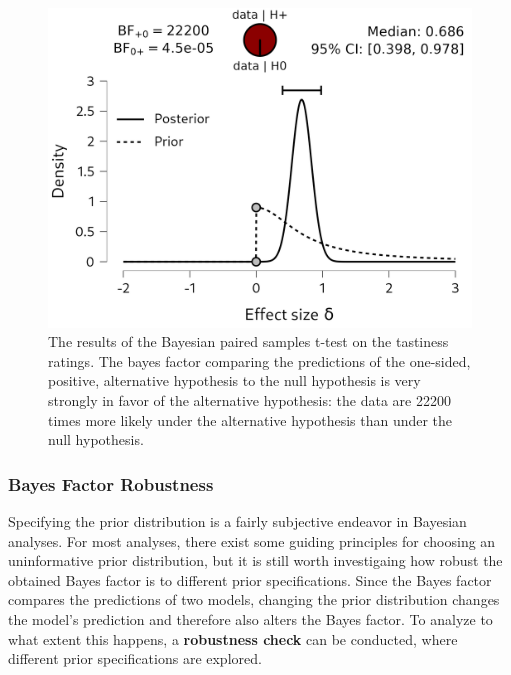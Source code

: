 \documentclass[
  letterpaper,
  DIV=11,
  numbers=noendperiod]{scrreprt}
\begin{document}
\begin{figure}

{\centering \includegraphics[width=1\textwidth,height=\textheight]{Figures/TTestBeerTastiness.png}

}

\caption{The results of the Bayesian paired samples t-test on the
tastiness ratings. The bayes factor comparing the predictions of the
one-sided, positive, alternative hypothesis to the null hypothesis is
very strongly in favor of the alternative hypothesis: the data are 22200
times more likely under the alternative hypothesis than under the null
hypothesis.}

\end{figure}

\hypertarget{bayes-factor-robustness}{%
\subsubsection{Bayes Factor Robustness}\label{bayes-factor-robustness}}

Specifying the prior distribution is a fairly subjective endeavor in
Bayesian analyses. For most analyses, there exist some guiding
principles for choosing an uninformative prior distribution, but it is
still worth investigaing how robust the obtained Bayes factor is to
different prior specifications. Since the Bayes factor compares the
predictions of two models, changing the prior distribution changes the
model's prediction and therefore also alters the Bayes factor. To
analyze to what extent this happens, a \textbf{robustness check} can be
conducted, where different prior specifications are explored.
\end{document}
